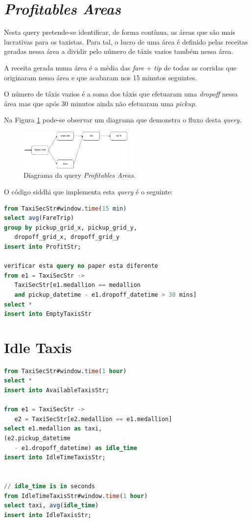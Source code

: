 \documentclass[article]{IEEEtran}
\begin{document}
\section{\textit{Profitables Areas}}

Nesta query pretende-se identificar, de forma contínua, as áreas que são mais lucrativas para os taxistas. Para tal, o lucro de uma área é definido pelas receitas geradas nessa área a dividir pelo número de táxis vazios também nessa área.

A receita gerada numa área é a média das \textit{fare} + \textit{tip} de todas as corridas que originaram nessa área e que acabaram nos 15 minutos seguintes.

O número de táxis vazios é a soma dos táxis que efetuaram uma \textit{dropoff} nessa área mas que após 30 minutos ainda não efetuaram uma \textit{pickup}.

Na Figura \ref{fig:profitablesAreasDiagram} pode-se observar um diagrama que demonstra o fluxo desta \textit{query}.

\begin{figure}[hbtp]
    \centering
        \includegraphics[width=0.5\textwidth]{images/profitableAreasDiagram}
    \caption{Diagrama da query \textit{Profitables Areas}.}
    \label{fig:profitablesAreasDiagram}
\end{figure}

O código siddhi que implementa esta \textit{query} é o seguinte:

\begin{lstlisting}[language=SQL]
from TaxiSecStr#window.time(15 min)
select avg(FareTrip)
group by pickup_grid_x, pickup_grid_y,
   dropoff_grid_x, dropoff_grid_y
insert into ProfitStr;

verificar esta query no paper esta diferente
from e1 = TaxiSecStr ->
   TaxiSecStr[e1.medallion == medallion 
   and pickup_datetime - e1.dropoff_datetime > 30 mins]
select * 
insert into EmptyTaxisStr 
\end{lstlisting}

\section{Idle Taxis}
\begin{lstlisting}[language=SQL]
from TaxiSecStr#window.time(1 hour)
select *
insert into AvailableTaxisStr;

from e1 = TaxiSecStr -> 
   e2 = TaxiSecStr[e2.medallion == e1.medallion]
select e1.medallion as taxi, 
(e2.pickup_datetime 
   - e1.dropoff_datetime) as idle_time
insert into IdleTimeTaxisStr;


// idle_time is in seconds
from IdleTimeTaxisStr#window.time(1 hour)
select taxi, avg(idle_time)
insert into IdleTaxisStr;
\end{lstlisting}
\end{document}

